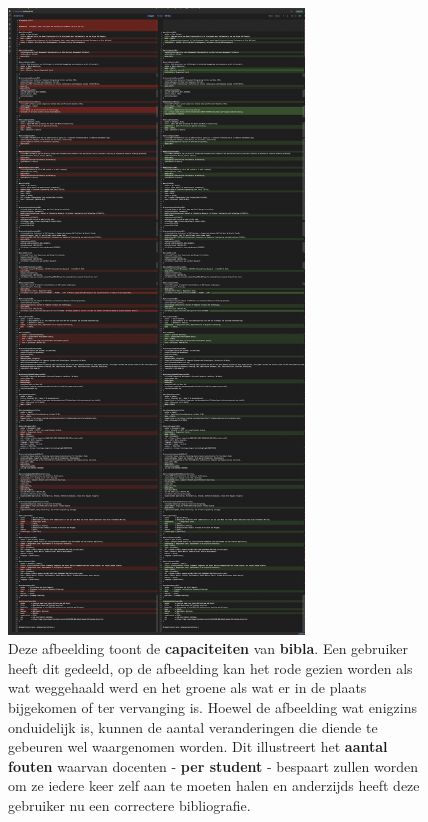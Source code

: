 \begin{figure}[ht]
    \centering
    \includegraphics[width=0.7\textwidth]{./files/bibla_is_useful.jpeg}
    \caption[Effectiviteit bibla]{Deze afbeelding toont de \textbf{capaciteiten} van \textbf{bibla}. Een gebruiker heeft dit gedeeld, op de afbeelding kan het rode gezien worden als wat weggehaald werd en het groene als wat er in de plaats bijgekomen of ter vervanging is. Hoewel de afbeelding wat enigzins onduidelijk is, kunnen de aantal veranderingen die diende te gebeuren wel waargenomen worden. Dit illustreert het \textbf{aantal fouten} waarvan docenten - \textbf{per student} - bespaart zullen worden om ze iedere keer zelf aan te moeten halen en anderzijds heeft deze gebruiker nu een correctere bibliografie.}
    \label{fig:bibla-is-useful}
\end{figure}


